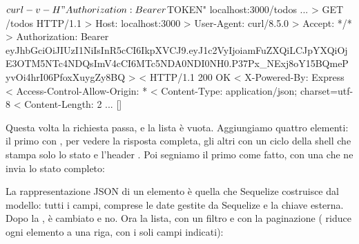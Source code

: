 \begin{console}[Terminale]
$ curl -v -H "Authorization: Bearer $TOKEN" localhost:3000/todos
...
> GET /todos HTTP/1.1
> Host: localhost:3000
> User-Agent: curl/8.5.0
> Accept: */*
> Authorization: Bearer eyJhbGciOiJIUzI1NiIsInR5cCI6IkpXVCJ9.eyJ1c2VyIjoiamFuZXQiLCJpYXQiOjE3OTM5NTc4NDQsImV4cCI6MTc5NDA0NDI0NH0.P37Px_NExj8oY15BQmePyvOi4hrI06PfoxXuygZy8BQ
>
< HTTP/1.1 200 OK
< X-Powered-By: Express
< Access-Control-Allow-Origin: *
< Content-Type: application/json; charset=utf-8
< Content-Length: 2
...
[]
\end{console}

Questa volta la richiesta passa, e la lista è vuota. Aggiungiamo quattro
elementi: il primo con , per vedere la risposta completa, gli altri
con un ciclo della shell che stampa solo lo stato e l'header .
Poi segniamo il primo come fatto, con una  che ne invia lo stato
completo:


La rappresentazione JSON di un elemento è quella che Sequelize costruisce dal
modello: tutti i campi, comprese le date gestite da Sequelize e la chiave
esterna. Dopo la ,  è cambiato e 
no. Ora la lista, con un filtro e con la paginazione ( riduce ogni
elemento a una riga, con i soli campi indicati):

